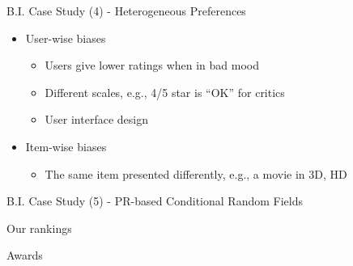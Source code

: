 \documentclass[
 size=14pt,
 paper=smartboard,  %
 mode=present, 		%
 display=slides, 	%
 style=tuliplab,  	%
 pauseslide,
 fleqn,leqno]{powerdot}
\begin{document}
\begin{slide}[toc=,bm=]{B.I. Case Study (4) - Heterogeneous Preferences}

\begin{itemize}
\item
User-wise biases

\begin{itemize}
\item
Users give lower ratings when in bad mood

\item
Different scales, e.g., 4/5 star is ``OK'' for critics

\item
User interface design

\end{itemize}

\item
Item-wise biases

\begin{itemize}
\item
The same item presented differently,
e.g., a movie in 3D, HD

\end{itemize}
\end{itemize}
\end{slide}


\begin{slide}[toc=,bm=]{B.I. Case Study (5) - PR-based Conditional Random Fields}


\end{slide}

\begin{slide}[toc=,bm=]{Our rankings}


\end{slide}

\begin{slide}[toc=,bm=]{Awards}


\end{slide}
\end{document}

